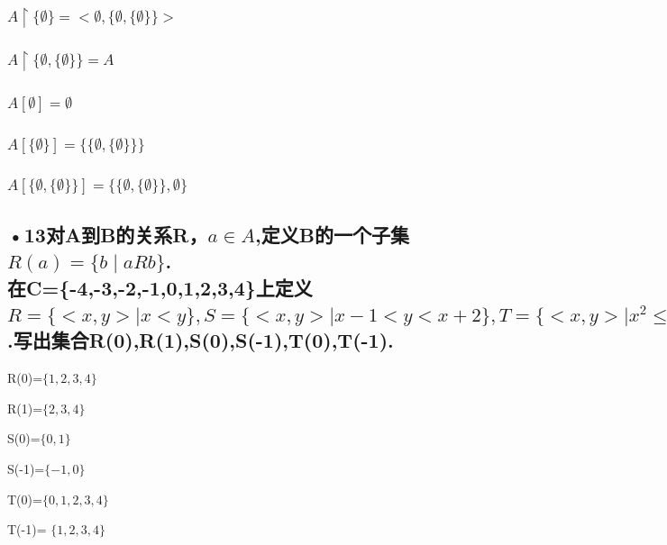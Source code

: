 \documentclass[UTF8]{ctexart}
\begin{document}
\subsubsection*{$A\upharpoonright \{\emptyset\}=<\emptyset ,\{\emptyset , \{\emptyset\}\} > $}
\subsubsection*{$A\upharpoonright \{\emptyset ,\{\emptyset\}\}=A $}
\subsubsection*{$A[\emptyset ] = \emptyset $}
\subsubsection*{$A[\{\emptyset\}]= \{\{\emptyset , \{\emptyset\}\} \}$}
\subsubsection*{$A[\{\emptyset ,\{\emptyset\}\}] =\{\{\emptyset , \{\emptyset\}\},\emptyset \}$}
\subsection*{•13对A到B的关系R，$a\in A$,定义B的一个子集$R(a)=\{b\mid aRb\}$.\\在C=\{-4,-3,-2,-1,0,1,2,3,4\}上定义$R=\{<x,y>\mid x<y\},S=\{<x,y>\mid x-1<y<x+2\},T=\{<x,y>\mid x^2\leqslant y\}$.写出集合R(0),R(1),S(0),S(-1),T(0),T(-1).}

R(0)=$\{1,2,3,4\} $

R(1)=$\{2,3,4\} $

S(0)=$\{0,1\} $

S(-1)=$\{-1,0\} $

T(0)=$\{0,1,2,3,4\} $

T(-1)= $\{1,2,3,4\} $
\end{document}
